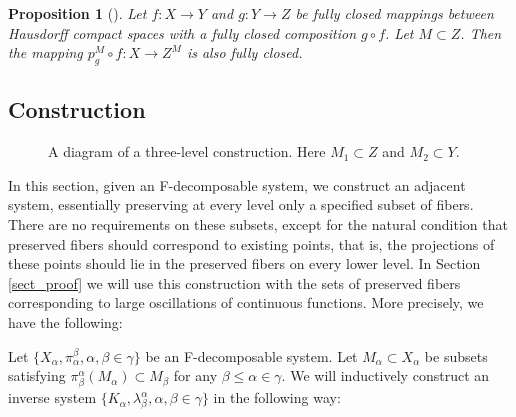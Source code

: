 \documentclass[11pt]{article}
\newtheorem{proposition}[theorem]{Proposition}
\theoremstyle{definition}
\theoremstyle{remark}
\begin{document}
\begin{proposition}[{\cite[II.1.13]{fedFC}}] \label{fed_level}
	Let $f: X \to Y$ and $g: Y \to Z$ be fully closed mappings between Hausdorff compact spaces with a fully closed composition $g \circ f$. Let $M \subset Z$. Then the mapping $p_g^M \circ f: X \to Z^M$ is also fully closed. 
\end{proposition}

\begin{center}
\end{center}

\subsection{Construction} \label{constr}

	\begin{figure}[h]
		\centering
		\caption{A diagram of a three-level construction. Here $M_1 \subset Z$ and $M_2 \subset Y$.}
	\end{figure}

In this section, given an F-decomposable system, we construct an adjacent system, essentially preserving at every level only a specified subset of fibers. There are no requirements on these subsets, except for the natural condition that preserved fibers should correspond to existing points, that is, the projections of these points should lie in the preserved fibers on every lower level. In Section \ref{sect_proof} we will use this construction with the sets of preserved fibers corresponding to large oscillations of continuous functions. More precisely, we have the following:

Let $\{X_\alpha, \pi_\alpha^\beta, \alpha, \beta \in \gamma\}$ be an F-decomposable system. Let $M_\alpha \subset X_\alpha$ be subsets satisfying $\pi^\alpha_\beta (M_\alpha) \subset M_\beta$ for any $\beta \leq \alpha \in \gamma$. We will inductively construct an inverse system $\{K_\alpha, \lambda^\alpha_\beta, \alpha, \beta \in \gamma\}$ in the following way:
\end{document}
